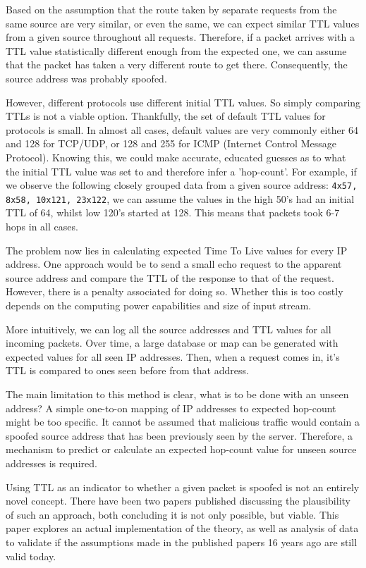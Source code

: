 \documentclass[12pt,twoside]{article}
\begin{document}
Based on the assumption that the route taken by separate requests from the same source are very similar, or even the same, we can expect similar TTL values from a given source throughout all requests. Therefore, if a packet arrives with a TTL value statistically different enough from the expected one, we can assume that the packet has taken a very different route to get there. Consequently, the source address was probably spoofed.

However, different protocols use different initial TTL values. So simply comparing TTLs is not a viable option. Thankfully, the set of default TTL values for protocols is small. In almost all cases, default values are very commonly either 64 and 128 for TCP/UDP, or 128 and 255 for ICMP (Internet Control Message Protocol). Knowing this, we could make accurate, educated guesses as to what the initial TTL value was set to and therefore infer a 'hop-count'. For example, if we observe the following closely grouped data from a given source address: \texttt{4x57, 8x58, 10x121, 23x122}, we can assume the values in the high 50's had an initial TTL of 64, whilst low 120's started at 128. This means that packets took 6-7 hops in all cases. 

The problem now lies in calculating expected Time To Live values for every IP address. One approach would be to send a small echo request to the apparent source address and compare the TTL of the response to that of the request. However, there is a penalty associated for doing so. Whether this is too costly depends on the computing power capabilities and size of input stream.

More intuitively, we can log all the source addresses and TTL values for all incoming packets. Over time, a large database or map can be generated with expected values for all seen IP addresses. Then, when a request comes in, it's TTL is compared to ones seen before from that address.

The main limitation to this method is clear, what is to be done with an unseen address? A simple one-to-on mapping of IP addresses to expected hop-count might be too specific. It cannot be assumed that malicious traffic would contain a spoofed source address that has been previously seen by the server. Therefore, a mechanism to predict or calculate an expected hop-count value for unseen source addresses is required. 

Using TTL as an indicator to whether a given packet is spoofed is not an entirely novel concept. There have been two papers published discussing the plausibility of such an approach, both concluding it is not only possible, but viable. This paper explores an actual implementation of the theory, as well as analysis of data to validate if the assumptions made in the published papers 16 years ago are still valid today.
\end{document}
